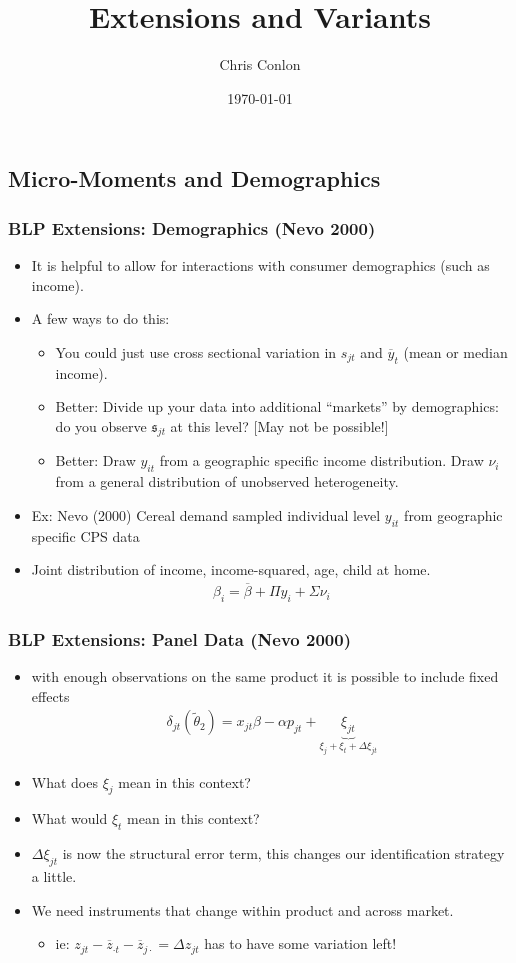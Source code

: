 \documentclass[aspectratio=169,11pt]{beamer}
\title{Extensions and Variants}
\author{Chris Conlon}
\institute{Grad IO}
\date{\today}
\begin{document}
\frame{\titlepage}

\subsection*{Micro-Moments and Demographics}
\begin{frame}
\frametitle{BLP Extensions: Demographics (Nevo 2000)}
\begin{itemize}
\item It is helpful to allow for interactions with consumer demographics (such as income).
\item A few ways to do this:
\begin{itemize}
\item You could just use cross sectional variation in $s_{jt}$ and $\overline{y}_t$ (mean or median income).
\item Better: Divide up your data into additional ``markets'' by demographics: do you observe $\mathfrak{s}_{jt}$ at this level? [May not be possible!]
\item Better: Draw $y_{it}$ from a geographic specific income distribution. Draw $\nu_i$ from a general distribution of unobserved heterogeneity.
\end{itemize}
\item Ex: Nevo (2000) Cereal demand sampled individual level $y_{it}$ from geographic specific CPS data
\item Joint distribution of income, income-squared, age, child at home.
\begin{align*}
\beta_i = \overline{\beta} + \Pi y_i + \Sigma \nu_i
\end{align*}
\end{itemize}
\end{frame}

\begin{frame}
\frametitle{BLP Extensions: Panel Data (Nevo 2000)}
\begin{itemize}
\item with enough observations on the same product it is possible to include fixed effects
\begin{eqnarray*}
\delta_{jt}(\widetilde{\theta}_2) = x_{jt} \beta - \alpha p_{jt} + \underbrace{\xi_{jt}}_{\xi_{j} + \xi_t + \Delta \xi_{jt}}
\end{eqnarray*}
\item What does $\xi_{j}$ mean in this context?
\item What would $\xi_t$ mean in this context?
\item $\Delta \xi_{jt}$ is now the structural error term, this changes our identification strategy a little.
\item We need instruments that change \alert{within product and across market}.
\begin{itemize}
\item ie: $z_{jt} - \overline{z}_{\cdot t} - \overline{z}_{j \cdot } = \Delta z_{jt}$ has to have some variation left!
\end{itemize}
\end{itemize}
\end{frame}
\end{document}
